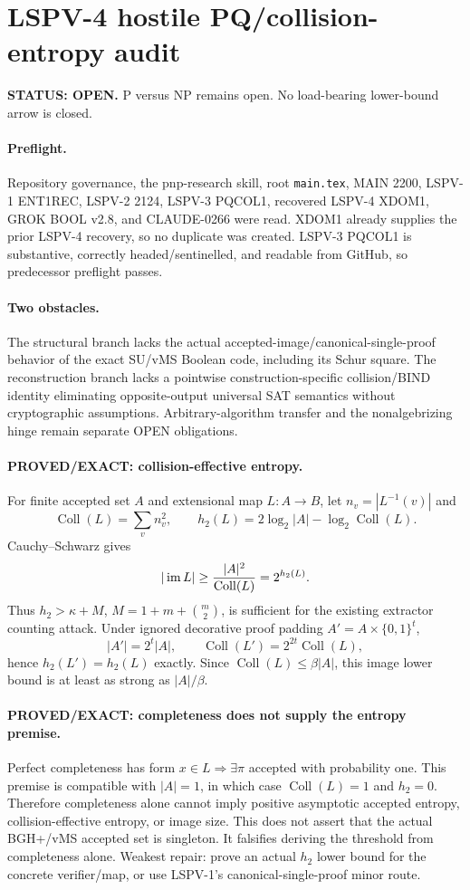 \documentclass[11pt]{article}
\begin{document}
\section*{LSPV-4 hostile PQ/collision-entropy audit}
\textbf{STATUS: OPEN.} P versus NP remains open. No load-bearing lower-bound arrow is closed.

\paragraph{Preflight.}
Repository governance, the pnp-research skill, root \texttt{main.tex}, MAIN 2200, LSPV-1 ENT1REC, LSPV-2 2124, LSPV-3 PQCOL1, recovered LSPV-4 XDOM1, GROK BOOL v2.8, and CLAUDE-0266 were read. XDOM1 already supplies the prior LSPV-4 recovery, so no duplicate was created. LSPV-3 PQCOL1 is substantive, correctly headed/sentinelled, and readable from GitHub, so predecessor preflight passes.

\paragraph{Two obstacles.}
The structural branch lacks the actual accepted-image/canonical-single-proof behavior of the exact SU/vMS Boolean code, including its Schur square. The reconstruction branch lacks a pointwise construction-specific collision/BIND identity eliminating opposite-output universal SAT semantics without cryptographic assumptions. Arbitrary-algorithm transfer and the nonalgebrizing hinge remain separate OPEN obligations.

\paragraph{PROVED/EXACT: collision-effective entropy.}
For finite accepted set $A$ and extensional map $L:A\to B$, let $n_v=|L^{-1}(v)|$ and
\[
\operatorname{Coll}(L)=\sum_v n_v^2,\qquad h_2(L)=2\log_2|A|-\log_2\operatorname{Coll}(L).
\]
Cauchy--Schwarz gives
\[
|\operatorname{im}L|\ge {|A|^2\over\operatorname{Coll}(L)}=2^{h_2(L)}.
\]
Thus $h_2>\kappa+M$, $M=1+m+\binom m2$, is sufficient for the existing extractor counting attack. Under ignored decorative proof padding $A'=A\times\{0,1\}^t$,
\[
|A'|=2^t|A|,\qquad \operatorname{Coll}(L')=2^{2t}\operatorname{Coll}(L),
\]
hence $h_2(L')=h_2(L)$ exactly. Since $\operatorname{Coll}(L)\le\beta|A|$, this image lower bound is at least as strong as $|A|/\beta$.

\paragraph{PROVED/EXACT: completeness does not supply the entropy premise.}
Perfect completeness has form $x\in L\Rightarrow\exists\pi$ accepted with probability one. This premise is compatible with $|A|=1$, in which case $\operatorname{Coll}(L)=1$ and $h_2=0$. Therefore completeness alone cannot imply positive asymptotic accepted entropy, collision-effective entropy, or image size. This does not assert that the actual BGH+/vMS accepted set is singleton. It falsifies deriving the threshold from completeness alone. Weakest repair: prove an actual $h_2$ lower bound for the concrete verifier/map, or use LSPV-1's canonical-single-proof minor route.
\end{document}
